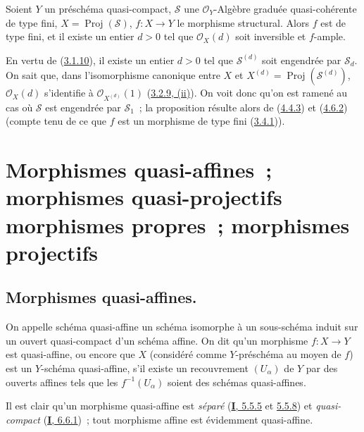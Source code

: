 \begin{proposition}[4.6.18]
\label{II.4.6.18-fr}
Soient $Y$ un préschéma quasi-compact, $\mathcal{S}$ une
$\mathcal{O}_Y$-Algèbre graduée quasi-cohérente de type fini,
$X=\operatorname{Proj}(\mathcal{S})$, $f:X\to Y$ le morphisme structural.
Alors $f$ est de type fini, et il existe un entier $d>0$ tel que
$\mathcal{O}_X(d)$ soit inversible et $f$-ample.
\end{proposition}

En vertu de (\hyperref[II.3.1.10-fr]{3.1.10}), il existe un entier $d>0$
tel que $\mathcal{S}^{(d)}$ soit engendrée par $\mathcal{S}_d$. On sait que,
dans l'isomorphisme canonique entre $X$ et
$X^{(d)}=\operatorname{Proj}(\mathcal{S}^{(d)})$, $\mathcal{O}_X(d)$
s'identifie à $\mathcal{O}_{X^{(d)}}(1)$
(\hyperref[II.3.2.9-fr]{3.2.9, (ii)}). On voit donc qu'on est ramené au cas
où $\mathcal{S}$ est engendrée par $\mathcal{S}_1$~; la proposition résulte
alors de (\hyperref[II.4.4.3-fr]{4.4.3}) et
(\hyperref[II.4.6.2-fr]{4.6.2}) (compte tenu de ce que $f$ est un morphisme
de type fini (\hyperref[II.3.4.1-fr]{3.4.1})).

\section{Morphismes quasi-affines~; morphismes quasi-projectifs morphismes
propres~; morphismes projectifs}
\label{section:II.5-fr}

\subsection{Morphismes quasi-affines.}
\label{subsection:II.5.1-fr}

\begin{definition}[5.1.1]
\label{II.5.1.1-fr}
On appelle schéma quasi-affine un schéma isomorphe à un sous-schéma
induit sur un ouvert quasi-compact d'un schéma affine. On dit qu'un morphisme
$f:X\to Y$ est quasi-affine, ou encore que $X$ (considéré comme
$Y$-préschéma au moyen de $f$) est un $Y$-schéma quasi-affine, s'il
existe un recouvrement $(U_\alpha)$ de $Y$ par des ouverts affines tels que
les $f^{-1}(U_\alpha)$ soient des schémas quasi-affines.
\end{definition}

Il est clair qu'un morphisme quasi-affine est \emph{séparé}
(\hyperref[I.5.5.5-fr]{\textbf{I}, 5.5.5} et \hyperref[I.5.5.8-fr]{5.5.8}) et
\emph{quasi-compact} (\hyperref[I.6.6.1-fr]{\textbf{I}, 6.6.1})~; tout morphisme
affine est évidemment quasi-affine.


